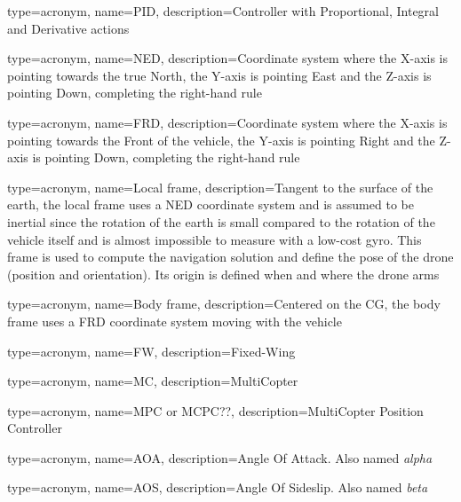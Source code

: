 {
	type=acronym,
	name={PID},
	description={Controller with Proportional, Integral and Derivative actions}
}

{
	type=acronym,
	name={NED},
	description={Coordinate system where the X-axis is pointing towards the true North, the Y-axis is pointing East and the Z-axis is pointing Down, completing the right-hand rule}
}

{
	type=acronym,
	name={FRD},
	description={Coordinate system where the X-axis is pointing towards the Front of the vehicle, the Y-axis is pointing Right and the Z-axis is pointing Down, completing the right-hand rule}
}

{
	type=acronym,
	name={Local frame},
	description={Tangent to the surface of the earth, the local frame uses a NED coordinate system and is assumed to be inertial since the rotation of the earth is small compared to the rotation of the vehicle itself and is almost impossible to measure with a low-cost gyro. This frame is used to compute the navigation solution and define the pose of the drone (position and orientation). Its origin is defined when and where the drone arms}
}

{
	type=acronym,
	name={Body frame},
	description={Centered on the CG, the body frame uses a FRD coordinate system moving with the vehicle}
}

{
	type=acronym,
	name={FW},
	description={Fixed-Wing}
}

{
	type=acronym,
	name={MC},
	description={MultiCopter}
}

{
	type=acronym,
	name={MPC or MCPC??},
	description={MultiCopter Position Controller}
}

{
	type=acronym,
	name={AOA},
	description={Angle Of Attack. Also named \textit{alpha}}
}

{
	type=acronym,
	name={AOS},
	description={Angle Of Sideslip. Also named \textit{beta}}
}
